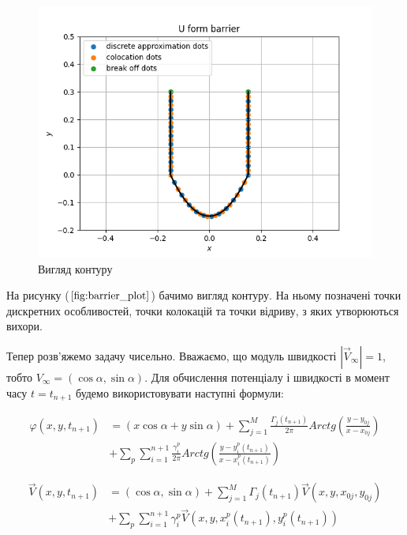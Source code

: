 \documentclass[a4paper,12pt]{article}
\begin{document}
	\begin{figure}[ht]
		\begin{center}\includegraphics[scale=1]{barrier_plot} \end{center}
		\caption{Вигляд контуру}
		\label{fig:barrier_plot}
	\end{figure}
	
	На рисунку ($\ref{fig:barrier_plot}$) бачимо вигляд контуру. На ньому позначені точки дискретних особливостей, точки колокацій та точки відриву, з яких утворюються вихори.
	
	Тепер розв'яжемо задачу чисельно. Вважаємо, що модуль швидкості $|\vec{V}_\infty| = 1$, тобто $V_\infty = (\cos{\alpha}, \sin{\alpha})$. Для обчислення потенціалу і швидкості в момент часу $t = t_{n+1}$ будемо використовувати наступні формули:
	\newpage
	
	\begin{align}
	\varphi(x,y,t_{n+1}) &= (x \cos \alpha + y \sin \alpha) + \sum\limits_{j=1}^{M} \frac{\Gamma_j(t_{n+1})}{2 \pi} Arctg \left(\frac{y - y_{0j}}{x - x_{0j}}\right)  \nonumber \\ &+\sum_p \sum\limits_{i=1}^{n+1} \frac{\gamma_{i}^{p}}{2 \pi} Arctg \left( \frac{ y - y_{i}^{p}(t_{n+1}) }{ x - x_{i}^{p} (t_{n+1}) }\right) \nonumber	
	\end{align}
	
	\begin{align}
	\vec{V}(x,y,t_{n+1}) &= (\cos \alpha, \sin \alpha) + \sum_{j=1}^{M} \Gamma_{j}(t_{n+1}) \vec{V}(x,y,x_{0j}, y_{0j}) \nonumber \\ &+\sum_p \sum_{i=1}^{n+1} \gamma_{i}^{p} \vec{V}(x,y,x_{i}^{p}(t_{n+1}), y_{i}^{p}(t_{n+1})) \nonumber
	\end{align}
	
\end{document}
